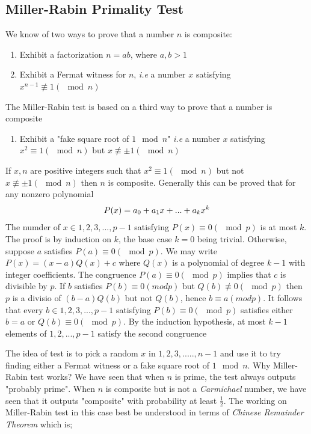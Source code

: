 \documentclass[12pt,journal,compsoc]{IEEEtran}
\begin{document}
\subsection{{Miller-Rabin Primality Test\cite{miller-rabin}}}
We know of two ways to prove that a number $n$ is composite:
\begin{enumerate}
\item Exhibit a factorization $n = ab$, where $a,b >1$
\item Exhibit a Fermat\cite{fermat} witness for $n$, \emph{i.e} a number $x$ satisfying $x^{n-1}\not\equiv 1 (\mod n)$
\end{enumerate}
The Miller-Rabin test is based on a third way to prove that a number is composite
\begin{enumerate}[ {}3{)} ]
\item Exhibit a "fake square root of $1 \mod n$" \emph{i.e} a number $x$ satisfying $x^{2} \equiv 1(\mod n)$ but $x \not \equiv \pm1 (\mod n)$
\end{enumerate}

If $x, n$ are positive integers such that $x^{2} \equiv 1 (\mod n)$ but not $x \not \equiv \pm1 (\mod n)$ then $n$ is composite. Generally this can be proved that for any nonzero polynomial
\begin{align}
P(x) = a_0 + a_1x + ... + a_kx^k \notag
\end{align}
The numder of $x \in {1, 2, 3, ... , p-1}$ satisfying $P(x) \equiv 0 (\mod p)$ is at most $k$. The proof is by induction on $k$, the base case $k = 0$ being trivial. Otherwise, suppose $a$ satisfies $P(a) \equiv 0 (\mod p)$. We may write $P(x) = (x - a)Q(x) + c$ where $Q(x)$ is a polynomial of degree $k-1$ with integer coefficients. The congruence $P(a) \equiv 0 (\mod p)$ implies that $c$ is divisible by $p$. If $b$ satisfies $P(b) \equiv 0 (mod p)$ but $Q(b) \not \equiv 0 (\mod p)$ then $p$ is a divisio of $(b-a)Q(b)$ but not $Q(b)$, hence $b \equiv a (mod p)$. It follows that every $b \in {1,2,3,...,p-1}$ satisfying $P(b) \equiv 0 (\mod p)$ satisfies either $b = a$ or $Q(b)\equiv 0(\mod p)$. By the induction hypothesis, at most $k-1$ elements of ${1, 2,...,p-1}$ satisfy the second congruence\cite{miller-rabin}

The idea of test is to pick a random $x$ in ${1,2,3,.....,n-1}$ and use it to try finding either a Fermat witness\cite{fermat} or a fake square root of $1 \mod n$. Why Miller-Rabin test works? We have seen that when $n$ is prime, the test always outputs "probably prime". When $n$ is composite but is not a \emph{Carmichael} number, we have seen that it outputs "composite" with probability at least $\frac{1}{2}$. The working on Miller-Rabin test in this case best be understood in terms of \emph{Chinese Remainder Theorem}\cite{chinese_theorem} which is;
\end{document}
